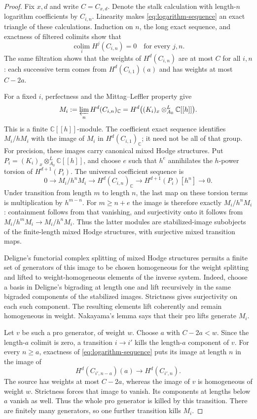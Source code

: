 \documentclass[11pt]{article}
\numberwithin{equation}{section}
\theoremstyle{definition}
\theoremstyle{remark}
\begin{document}
\begin{proof}
Fix $x,d$ and write $C=C_{x,d}$.  Denote the stalk calculation with
length-$n$ logarithm coefficients by $C_{i,n}$.
Linearity makes \eqref{eq:logarithm-sequence} an exact triangle of
these calculations.  Induction on $n$, the long exact sequence,
and exactness of filtered colimits show that
\[
 \operatorname*{colim}_i H^j(C_{i,n})=0
                  \quad\text{for every }j,n.
\]
The same filtration shows that the weights of $H^d(C_{i,n})$ are
at most $C$ for all $i,n$: each successive term comes from
$H^d(C_{i,1})(a)$ and has weights at most $C-2a$.

For a fixed $i$, perfectness and the Mittag--Leffler property give
\[
 M_i:=\varprojlim_n H^d(C_{i,n})_{\mathbb C}
   =H^d\bigl((K_i)_x\mathbin{\otimes}^{L}_{A_0}
                                             \mathbb C[[h]]\bigr).
\]
This is a finite $\mathbb C[[h]]$-module.  The coefficient exact
sequence identifies $M_i/hM_i$ with the image of $M_i$ in
$H^d(C_{i,1})_{\mathbb C}$; it need not be all of that group.
For precision, these images carry canonical mixed Hodge
structures.  Put
$P_i=(K_i)_x\otimes^L_{A_0}\mathbb C[[h]]$, and choose $e$
such that $h^e$ annihilates the $h$-power torsion of
$H^{d+1}(P_i)$.  The universal
coefficient sequence is
\[
 0\longrightarrow M_i/h^nM_i\longrightarrow
 H^d(C_{i,n})_{\mathbb C}\longrightarrow
 H^{d+1}(P_i)[h^n]\longrightarrow0.
\]
Under transition from length $m$ to length $n$, the last map
on these torsion terms is multiplication by $h^{m-n}$.
For $m\ge n+e$ the image is therefore exactly $M_i/h^nM_i$:
containment follows from that vanishing, and surjectivity
onto it follows from $M_i/h^mM_i\to M_i/h^nM_i$.
Thus the latter modules are stabilized-image subobjects of
the finite-length mixed Hodge structures, with surjective
mixed transition maps.

Deligne's functorial complex splitting of mixed Hodge structures
\cite{DeligneHodge} permits a finite set of generators of this
image to be chosen homogeneous for the weight splitting and
lifted to weight-homogeneous elements of the inverse system.
Indeed, choose a basis in Deligne's bigrading at length one
and lift recursively in the same bigraded components of
the stabilized images.  Strictness gives surjectivity on
each such component.  The resulting elements lift
coherently and remain homogeneous in weight.  Nakayama's
lemma says that their pro lifts generate $M_i$.

Let $v$ be such a pro generator, of weight $w$.  Choose $a$ with
$C-2a<w$.  Since the length-$a$ colimit is zero, a transition
$i\to i'$ kills the length-$a$ component of $v$.  For every
$n\ge a$, exactness of \eqref{eq:logarithm-sequence} puts its
image at length $n$ in the image of
\[
                 H^d(C_{i',n-a})(a)
                       \longrightarrow H^d(C_{i',n}).
\]
The source has weights at most $C-2a$, whereas the image of $v$
is homogeneous of weight $w$.  Strictness forces that image to
vanish.  Its components at lengths below $a$ vanish as well.
Thus the whole pro generator is killed by this transition.
There are finitely many generators, so one further transition
kills $M_i$.


\end{proof}
\end{document}
